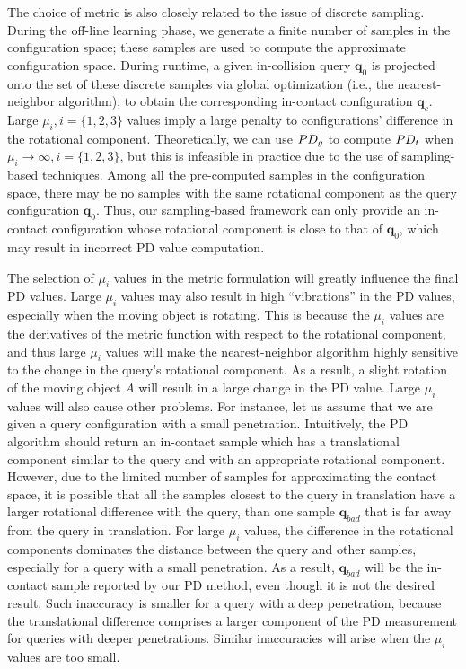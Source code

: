 The choice of metric is also closely related to the issue of discrete sampling. During the off-line learning phase, we generate a finite number of samples in the configuration space; these samples are used to compute the approximate configuration space. During runtime, a given in-collision query $\mathbf q_0$ is projected onto the set of these discrete samples via global optimization (i.e., the nearest-neighbor algorithm), to obtain the corresponding in-contact configuration $\mathbf q_c$. Large $\mu_i, i=\{1,2,3\}$ values imply a large penalty to configurations' difference in the rotational component. Theoretically, we can use $PD_g$ to compute $PD_t$ when $\mu_i \rightarrow \infty, i=\{1,2,3\}$, but this is infeasible in practice due to the use of sampling-based techniques. Among all the pre-computed samples in the configuration space, there may be no samples with the same rotational component as the query configuration $\mathbf q_0$. Thus, our sampling-based framework can only provide an in-contact configuration whose rotational component is close to that of $\mathbf q_0$, which may result in incorrect PD value computation.

The selection of $\mu_i$ values in the metric formulation will greatly influence the final PD values. Large $\mu_i$ values may also result in high ``vibrations'' in the PD values, especially when the moving object is rotating. This is because the $\mu_i$ values are the derivatives of the metric function with respect to the rotational component, and thus large $\mu_i$ values will make the nearest-neighbor algorithm highly sensitive to the change in the query's rotational component. As a result, a slight rotation of the moving object $A$ will result in a large change in the PD value. Large $\mu_i$ values will also cause other problems. For instance, let us assume that we are given a query configuration with a small penetration. Intuitively, the PD algorithm should return an in-contact sample which has a translational component similar to the query and with an appropriate rotational component. However, due to the limited number of samples for approximating the contact space, it is possible that all the samples closest to the query in translation have a larger rotational difference with the query, than one sample $\mathbf q_{bad}$ that is far away from the query in translation. For large $\mu_i$ values, the difference in the rotational components dominates the distance between the query and other samples, especially for a query with a small penetration. As a result, $\mathbf q_{bad}$ will be the in-contact sample reported by our PD method, even though it is not the desired result. Such inaccuracy is smaller for a query with a deep penetration, because the translational difference comprises a larger component of the PD measurement for queries with deeper penetrations. Similar inaccuracies will arise when the $\mu_i$ values are too small. 

